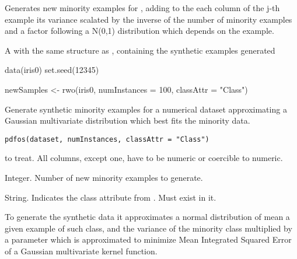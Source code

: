 %
\begin{Details}\relax
Generates  new minority examples for ,
adding to the each column of the j-th example its variance scalated by the
inverse of the number of minority examples and a factor following a N(0,1)
distribution which depends on the example.
\end{Details}
%
\begin{Value}
A  with the same structure as ,
containing the synthetic examples generated
\end{Value}
%
\begin{Examples}
\begin{ExampleCode}
data(iris0)
set.seed(12345)

newSamples <- rwo(iris0, numInstances = 100, classAttr = "Class")

\end{ExampleCode}
\end{Examples}
%
\begin{Description}\relax
Generate synthetic minority examples for a numerical dataset approximating a
Gaussian multivariate distribution which best fits the minority data.
\end{Description}
%
\begin{Usage}
\begin{verbatim}
pdfos(dataset, numInstances, classAttr = "Class")
\end{verbatim}
\end{Usage}
%
\begin{Arguments}
\begin{ldescription}
\item[\code{dataset}]  to treat. All columns, except
 one, have to be numeric or coercible to numeric.

\item[\code{numInstances}] Integer. Number of new minority examples to generate.

\item[\code{classAttr}] String. Indicates the class attribute from .
Must exist in it.
\end{ldescription}
\end{Arguments}
%
\begin{Details}\relax
To generate the synthetic data it approximates a normal distribution of mean
a given example of such class, and the variance of the minority class 
multiplied by a parameter which is approximated to minimize Mean Integrated
Squared Error of a Gaussian multivariate kernel function.
\end{Details}
